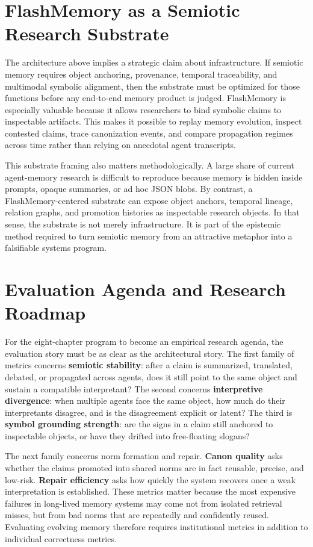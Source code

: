 \documentclass[11pt]{article}
\begin{document}
\section{FlashMemory as a Semiotic Research Substrate}
\label{sec:substrate}

The architecture above implies a strategic claim about infrastructure. If semiotic memory requires object anchoring, provenance, temporal traceability, and multimodal symbolic alignment, then the substrate must be optimized for those functions before any end-to-end memory product is judged. FlashMemory is especially valuable because it allows researchers to bind symbolic claims to inspectable artifacts. This makes it possible to replay memory evolution, inspect contested claims, trace canonization events, and compare propagation regimes across time rather than relying on anecdotal agent transcripts.

This substrate framing also matters methodologically. A large share of current agent-memory research is difficult to reproduce because memory is hidden inside prompts, opaque summaries, or ad hoc JSON blobs. By contrast, a FlashMemory-centered substrate can expose object anchors, temporal lineage, relation graphs, and promotion histories as inspectable research objects. In that sense, the substrate is not merely infrastructure. It is part of the epistemic method required to turn semiotic memory from an attractive metaphor into a falsifiable systems program.

\section{Evaluation Agenda and Research Roadmap}
\label{sec:evaluation}

For the eight-chapter program to become an empirical research agenda, the evaluation story must be as clear as the architectural story. The first family of metrics concerns \textbf{semiotic stability}: after a claim is summarized, translated, debated, or propagated across agents, does it still point to the same object and sustain a compatible interpretant? The second concerns \textbf{interpretive divergence}: when multiple agents face the same object, how much do their interpretants disagree, and is the disagreement explicit or latent? The third is \textbf{symbol grounding strength}: are the signs in a claim still anchored to inspectable objects, or have they drifted into free-floating slogans?

The next family concerns norm formation and repair. \textbf{Canon quality} asks whether the claims promoted into shared norms are in fact reusable, precise, and low-risk. \textbf{Repair efficiency} asks how quickly the system recovers once a weak interpretation is established. These metrics matter because the most expensive failures in long-lived memory systems may come not from isolated retrieval misses, but from bad norms that are repeatedly and confidently reused. Evaluating evolving memory therefore requires institutional metrics in addition to individual correctness metrics.
\end{document}
